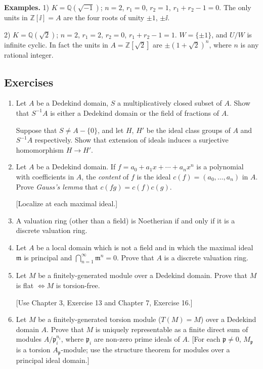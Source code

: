 \noindent\textbf{Examples.} 1) $K=\mathbb Q(\sqrt{-1})$; $n=2$, $r_1=0$, $r_2=1$, $r_1+r_2-1=0$. The only units in $\mathbb Z[\ii]=A$ are the four roots of unity $\pm1$, $\pm \ii$.

2) $K=\mathbb Q(\sqrt2)$; $n=2$, $r_1=2$, $r_2=0$, $r_1+r_2-1=1$. $W=\{\pm1\}$, and $U/W$ is infinite cyclic. In fact the units in $A=\mathbb Z[\sqrt2]$ are $\pm(1+\sqrt2)^n$, where $n$ is any rational integer.

\subsection{Exercises}

\begin{enumerate}
\item Let $A$ be a Dedekind domain, $S$ a multiplicatively closed subset of $A$. Show that $S^{-1}A$ is either a Dedekind domain or the field of fractions of $A$.

Suppose that $S\neq A-\{0\}$, and let $H$, $H'$ be the ideal class groups of $A$ and $S^{-1}A$ respectively. Show that extension of ideals induces a surjective homomorphism $H\longrightarrow H'$.

\item Let $A$ be a Dedekind domain. If $f=a_0+a_1x+\cdots+a_nx^n$ is a polynomial with coefficients in $A$, the \textit{content} of $f$ is the ideal $c(f)=(a_0,\ldots,a_n)$ in $A$. Prove \textit{Gauss's lemma} that $c(fg)=c(f)c(g)$.

[Localize at each maximal ideal.]

\item A valuation ring (other than a field) is Noetherian if and only if it is a discrete valuation ring.

\item Let $A$ be a local domain which is not a field and in which the maximal ideal $\mathfrak m$ is principal and $\bigcap_{n=1}^{\infty}\mathfrak m^n=0$. Prove that $A$ is a discrete valuation ring.

\item Let $M$ be a finitely-generated module over a Dedekind domain. Prove that $M$ is flat $\Longleftrightarrow M$ is torsion-free.

[Use Chapter 3, Exercise 13 and Chapter 7, Exercise 16.]

\item Let $M$ be a finitely-generated torsion module ($T(M)=M$) over a Dedekind domain $A$. Prove that $M$ is uniquely representable as a finite direct sum of modules $A/\mathfrak p_i^{n_i}$, where $\mathfrak p_i$ are non-zero prime ideals of $A$. [For each $\mathfrak p\neq0$, $M_{\mathfrak p}$ is a torsion $A_{\mathfrak p}$-module; use the structure theorem for modules over a principal ideal domain.]


\end{enumerate}
